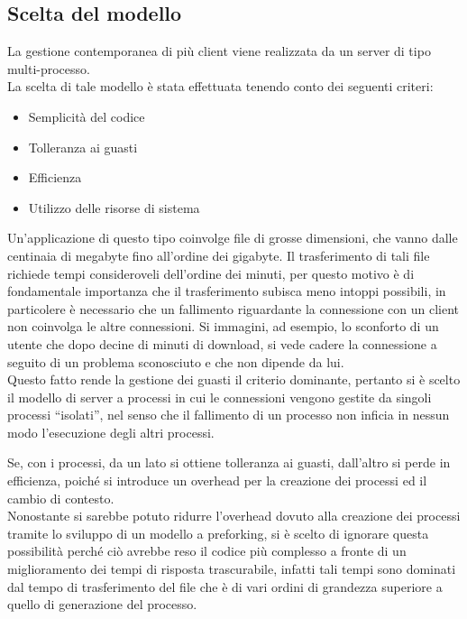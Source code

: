 \subsection{Scelta del modello}

La gestione contemporanea di più client viene realizzata da un server di tipo multi-processo.\\
La scelta di tale modello è stata effettuata tenendo conto dei seguenti criteri:
\begin{itemize}
\item Semplicità del codice
\item Tolleranza ai guasti
\item Efficienza
\item Utilizzo delle risorse di sistema
\end{itemize}
Un'applicazione di questo tipo coinvolge file di grosse dimensioni, 
che vanno dalle centinaia di megabyte fino all'ordine dei gigabyte. 
Il trasferimento di tali file richiede tempi consideroveli dell'ordine
dei minuti, per questo motivo è di fondamentale importanza che il trasferimento
subisca meno intoppi possibili, in particolere è necessario che un fallimento 
riguardante la connessione con un client non coinvolga le altre connessioni. 
Si immagini, ad esempio, lo sconforto di un utente che dopo decine di minuti di
download, si vede cadere la connessione a seguito di un problema sconosciuto e 
che non dipende da lui.\\
Questo fatto rende la gestione dei guasti il criterio dominante, pertanto si è 
scelto il modello di server a processi in cui le connessioni vengono gestite da
singoli processi ``isolati'', nel senso che il fallimento di un processo non 
inficia in nessun modo l'esecuzione degli altri processi.

Se, con i processi, da un lato si ottiene tolleranza ai guasti, dall'altro si 
perde in efficienza, poiché si introduce un overhead per la creazione dei
processi ed il cambio di contesto.\\
Nonostante si sarebbe potuto ridurre l'overhead dovuto alla creazione dei 
processi tramite lo sviluppo di un modello a preforking, si è scelto di 
ignorare questa possibilità perché ciò avrebbe reso il codice più complesso a
fronte di un miglioramento dei tempi di risposta trascurabile, infatti tali 
tempi sono dominati dal tempo di trasferimento del file che è di vari ordini 
di grandezza superiore a quello di generazione del processo.
